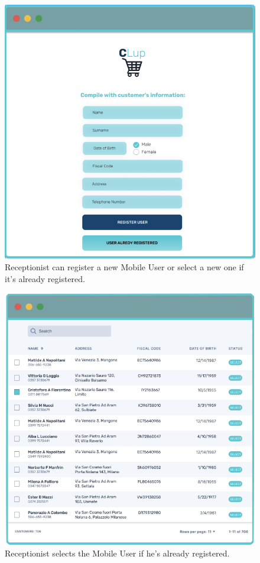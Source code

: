 \begin{figure}[H]
  \caption{Receptionist can register a new Mobile User or select a new one if it's already registered.}
  \label{fig:Login}
  \centering
  \includegraphics[scale=0.35]{images/mockup/LOGREG.png}

\end{figure}

\begin{figure}[H]
  \caption{Receptionist selects the Mobile User if he's already registered.}
  \label{fig:Login}
  \centering
  \includegraphics[scale=0.35]{images/mockup/Select_User.png}

\end{figure}

